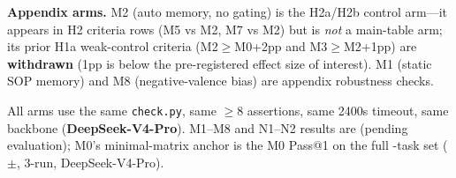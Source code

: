 \textbf{Appendix arms.} M2 (auto memory, no gating) is the H2a/H2b control arm---it appears in H2 criteria rows (M5 vs M2, M7 vs M2) but is \emph{not} a main-table arm; its prior H1a weak-control criteria (M2$\geq$M0+2pp and M3$\geq$M2+1pp) are \textbf{withdrawn} (1pp is below the pre-registered effect size of interest). M1 (static SOP memory) and M8 (negative-valence bias) are appendix robustness checks.

All arms use the same \texttt{check.py}, same $\geq$8 assertions, same 2400s timeout, same backbone (\textbf{DeepSeek-V4-Pro}). M1--M8 and N1--N2 results are \TBD (pending evaluation); M0's minimal-matrix anchor is the M0 Pass@1 on the full \Ncases{}-task set (\MzeroPass{}$\pm$\MzeroStd{}, 3-run, DeepSeek-V4-Pro).
